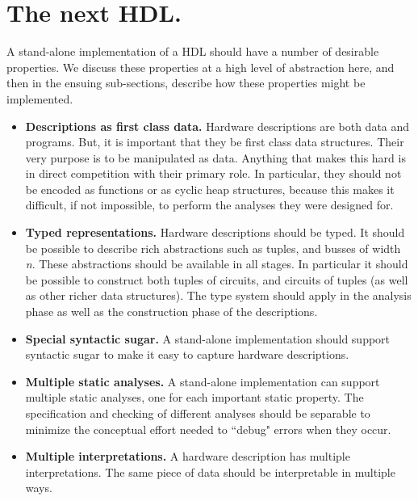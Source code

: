 \documentclass[10pt,twoside]{article}
\begin{document}
\section{The next HDL.}

A stand-alone implementation of a HDL should have a number of
desirable properties. We discuss these properties at a high level of
abstraction here, and then in the ensuing sub-sections, describe how
these properties might be implemented.


\begin{itemize} 

\item{\bf Descriptions as first class data.} Hardware descriptions
are both data and programs. But, it is important that they be first
class data structures. Their very purpose is to be manipulated as
data. Anything that makes this hard is in direct competition with
their primary role. In particular, they should not be encoded as
functions or as cyclic heap structures, because this makes it
difficult, if not impossible, to perform the analyses they were
designed for.

\item{\bf Typed representations.} Hardware descriptions should be
typed. It should be possible to describe rich abstractions such as
tuples, and busses of width {\it n}. These abstractions should be
available in all stages. In particular it should be possible to
construct both tuples of circuits,  and circuits of tuples (as well as
other richer data structures). The type system should apply in the
analysis phase as well as the construction phase of the descriptions.

\item{\bf Special syntactic sugar.} A stand-alone implementation
should support syntactic sugar to make it easy to capture  
hardware descriptions.

\item{\bf Multiple static analyses.} A stand-alone implementation can
support multiple static analyses, one for each important static
property. The specification and checking of different analyses
should be separable to minimize the conceptual effort needed to
``debug" errors when they occur.

\item{\bf Multiple interpretations.} A hardware description has
multiple interpretations. The same piece of data should be
interpretable in multiple ways.

\end{itemize}
\end{document}
